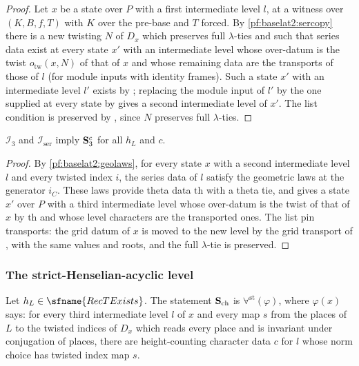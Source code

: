 \begin{proof}
Let $x$ be a state over $P$ with a first intermediate level $l$, at a witness over $(K,B,f,T)$ with $K$ over
the pre-base and $T$ forced. By \cref{pf:baselat2:sercopy} there is a new twisting $N$ of $D_x$ which preserves
full $\lambda$-ties and such that series data exist at every state $x'$ with an intermediate level whose
over-datum is the twist $o_{\mathrm{tw}}(x,N)$ of that of $x$ and whose remaining data are the transports of those
of $l$ (for module inputs with identity frames). Such a state $x'$ with an intermediate level
$l'$ exists by ; replacing the module
input of $l'$ by the one supplied at every state by
 gives a second intermediate level
of $x'$. The list condition is preserved by ,
since $N$ preserves full $\lambda$-ties.
\end{proof}

\begin{proposition}\label{pf:baselat2:points}
$\mathcal{I}_3$ and $\mathcal{I}_{\mathrm{ser}}$ imply $\mathbf{S}_{\mathrm{3}}^{c}$ for all $h_L$ and $c$.
\end{proposition}

\begin{proof}
By \cref{pf:baselat2:geolaws}, for every state $x$ with a second intermediate level $l$ and every twisted
index $i$, the series data of $l$ satisfy the geometric laws at the generator $i_C$. These laws provide theta
data $\mathrm{th}$ with a theta tie, and
 gives a state $x'$ over $P$ with a third
intermediate level whose over-datum is the twist of that of $x$ by $\mathrm{th}$ and whose level characters
are the transported ones. The list pin transports: the grid datum of $x$ is moved to the new level by
the grid transport of , with the same values and roots, and the full
$\lambda$-tie is preserved.
\end{proof}

\subsubsection{The strict-Henselian-acyclic level}

\begin{definition}\label{pf:baselat2:thirdstage}
Let $h_L\in\sfname{RecTExists}$. The statement $\mathbf{S}_{\mathrm{ch}}$ is $\forall^{\mathrm{st}}(\varphi)$, where $\varphi(x)$ says: for
every third intermediate level $l$ of $x$ and every map $s$ from the places of $L$ to the twisted indices of
$D_x$ which reads every place and is invariant under conjugation of places, there are height-counting
character data $c$ for $l$ whose norm choice has twisted index map $s$.
\end{definition}

